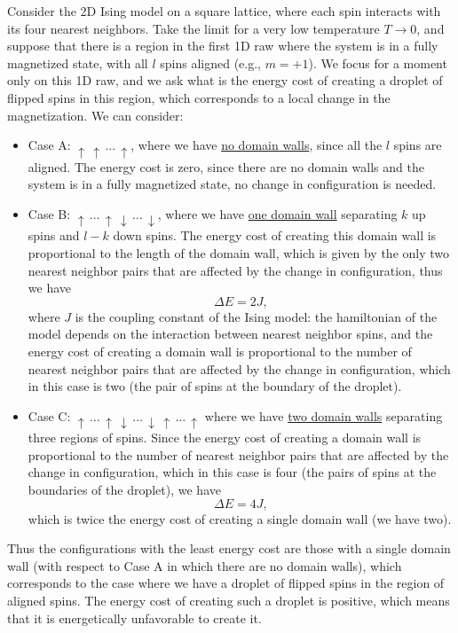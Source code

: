 Consider the 2D Ising model on a square lattice, where each spin interacts with its four nearest neighbors. Take the limit for a very low temperature \(T \to 0\), and suppose that there is a region in the first 1D raw where the system is in a fully magnetized state, with all \(l\) spins aligned (e.g., \(m = +1\)). We focus for a moment only on this 1D raw, and we ask what is the energy cost of creating a droplet of flipped spins in this region, which corresponds to a local change in the magnetization. We can consider:
\begin{itemize}
  \item Case A: \(\uparrow\,\uparrow\,\dots \,\uparrow \), where we have \uline{no domain walls}, since all the \(l\) spins are aligned. The energy cost is zero, since there are no domain walls and the system is in a fully magnetized state, no change in configuration is needed.
  \item Case B: \(\uparrow\,\dots \,\uparrow \,\downarrow\,\dots \,\downarrow \), where we have \uline{one domain wall} separating \(k\) up spins and \(l-k\) down spins. The energy cost of creating this domain wall is proportional to the length of the domain wall, which is given by the only two nearest neighbor pairs that are affected by the change in configuration, thus we have
        \[
          \Delta E = 2 J,
        \]
        where \(J\) is the coupling constant of the Ising model: the hamiltonian of the model depends on the interaction between nearest neighbor spins, and the energy cost of creating a domain wall is proportional to the number of nearest neighbor pairs that are affected by the change in configuration, which in this case is two (the pair of spins at the boundary of the droplet).
  \item Case C: \(\uparrow\,\dots\,\uparrow\,\downarrow\,\dots\,\downarrow\,\uparrow\,\dots\,\uparrow\) where we have \uline{two domain walls} separating three regions of spins. Since the energy cost of creating a domain wall is proportional to the number of nearest neighbor pairs that are affected by the change in configuration, which in this case is four (the pairs of spins at the boundaries of the droplet), we have
        \[
          \Delta E = 4 J,
        \]
        which is twice the energy cost of creating a single domain wall (we have two).
\end{itemize}
Thus the configurations with the least energy cost are those with a single domain wall (with respect to Case A in which there are no domain walls), which corresponds to the case where we have a droplet of flipped spins in the region of aligned spins. The energy cost of creating such a droplet is positive, which means that it is energetically unfavorable to create it.

